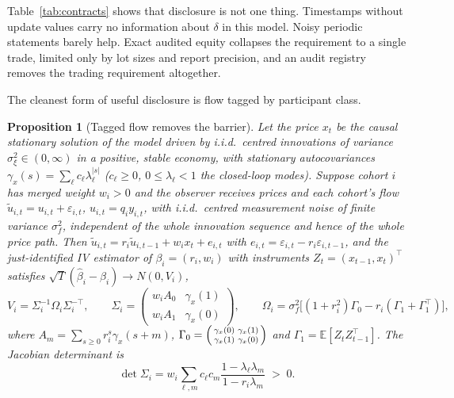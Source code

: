 \documentclass[12pt]{article}
\newtheorem{proposition}[theorem]{Proposition}
\theoremstyle{definition}
\theoremstyle{remark}
\newcommand{\E}{\mathbb{E}}
\begin{document}
Table~\ref{tab:contracts} shows that disclosure is not one thing. Timestamps without update values carry no information about $\delta$ in this model. Noisy periodic statements barely help. Exact audited equity collapses the requirement to a single trade, limited only by lot sizes and report precision, and an audit registry removes the trading requirement altogether.

The cleanest form of useful disclosure is flow tagged by participant class.

\begin{proposition}[Tagged flow removes the barrier]\label{prop:tagged}
Let the price $x_t$ be the causal stationary solution of the model driven by i.i.d.\ centred innovations of variance $\sigma_\xi^2\in(0,\infty)$ in a positive, stable economy, with stationary autocovariances $\gamma_x(s)=\sum_\ell c_\ell\lambda_\ell^{|s|}$ ($c_\ell\ge0$, $0\le\lambda_\ell<1$ the closed-loop modes). Suppose cohort $i$ has merged weight $w_i>0$ and the observer receives prices and each cohort's flow $\tilde u_{i,t}=u_{i,t}+\varepsilon_{i,t}$, $u_{i,t}=q_iy_{i,t}$, with i.i.d.\ centred measurement noise of finite variance $\sigma_f^2$, independent of the whole innovation sequence and hence of the whole price path. Then $\tilde u_{i,t}=r_i\tilde u_{i,t-1}+w_ix_t+e_{i,t}$ with $e_{i,t}=\varepsilon_{i,t}-r_i\varepsilon_{i,t-1}$, and the just-identified IV estimator of $\beta_i=(r_i,w_i)$ with instruments $Z_t=(x_{t-1},x_t)^\top$ satisfies $\sqrt T(\hat\beta_i-\beta_i)\to N(0,V_i)$,
\begin{equation}\label{eq:ivvar}
V_i=\Sigma_i^{-1}\Omega_i\Sigma_i^{-\top},\qquad \Sigma_i=\begin{pmatrix}w_iA_0&\gamma_x(1)\\ w_iA_1&\gamma_x(0)\end{pmatrix},\qquad \Omega_i=\sigma_f^2\bigl[(1+r_i^2)\Gamma_0-r_i(\Gamma_1+\Gamma_1^\top)\bigr],
\end{equation}
where $A_m=\sum_{s\ge0}r_i^s\gamma_x(s+m)$, $\Gamma_0=\begin{psmallmatrix}\gamma_x(0)&\gamma_x(1)\\ \gamma_x(1)&\gamma_x(0)\end{psmallmatrix}$ and $\Gamma_1=\E[Z_tZ_{t-1}^\top]$. The Jacobian determinant is
\begin{equation}\label{eq:ivdet}
\det\Sigma_i=w_i\sum_{\ell,m}c_\ell c_m\frac{1-\lambda_\ell\lambda_m}{1-r_i\lambda_m}\;>\;0 .
\end{equation}

\end{proposition}
\end{document}
